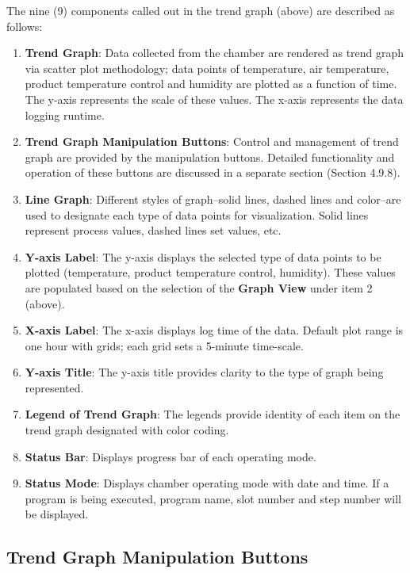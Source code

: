 The nine (9) components called out in the trend graph (above) are
described as follows:

\begin{enumerate}
\def\labelenumi{\arabic{enumi}.}
\item
  \textbf{Trend Graph}: Data collected from the chamber are rendered as
  trend graph via scatter plot methodology; data points of temperature,
  air temperature, product temperature control and humidity are plotted
  as a function of time. The y-axis represents the scale of these
  values. The x-axis represents the data logging runtime.
\item
  \textbf{Trend Graph Manipulation Buttons}: Control and management of
  trend graph are provided by the manipulation buttons. Detailed
  functionality and operation of these buttons are discussed in a
  separate section (Section 4.9.8).
\item
  \textbf{Line Graph}: Different styles of graph--solid lines, dashed
  lines and color--are used to designate each type of data points for
  visualization. Solid lines represent process values, dashed lines set
  values, etc.
\item
  \textbf{Y-axis Label}: The y-axis displays the selected type of data
  points to be plotted (temperature, product temperature control,
  humidity). These values are populated based on the selection of the
  \textbf{Graph View} under item 2 (above).
\item
  \textbf{X-axis Label}: The x-axis displays log time of the data.
  Default plot range is one hour with grids; each grid sets a 5-minute
  time-scale.
\item
  \textbf{Y-axis Title}: The y-axis title provides clarity to the type
  of graph being represented.
\item
  \textbf{Legend of Trend Graph}: The legends provide identity of each
  item on the trend graph designated with color coding.
\item
  \textbf{Status Bar}: Displays progress bar of each operating mode.
\item
  \textbf{Status Mode}: Displays chamber operating mode with date and
  time. If a program is being executed, program name, slot number and
  step number will be displayed.
\end{enumerate}


\subsection{Trend Graph Manipulation
Buttons}

